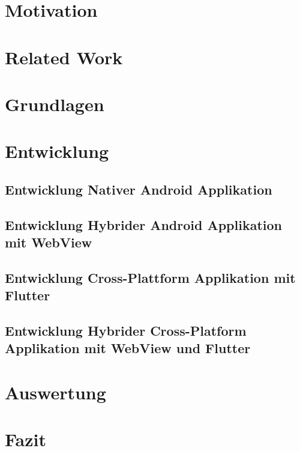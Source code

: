\documentclass[12pt,a4paper,twosided,openany]{scrbook}
\begin{document}


\mainmatter

\chapter{Motivation}

\chapter{Related Work}

\chapter{Grundlagen}

\chapter{Entwicklung}

\section{Entwicklung Nativer Android Applikation}

\section{Entwicklung Hybrider Android Applikation mit WebView}

\section{Entwicklung Cross-Plattform Applikation mit Flutter}

\section{Entwicklung Hybrider Cross-Platform Applikation mit WebView und Flutter}

\chapter{Auswertung}

\chapter{Fazit}

\end{document}
